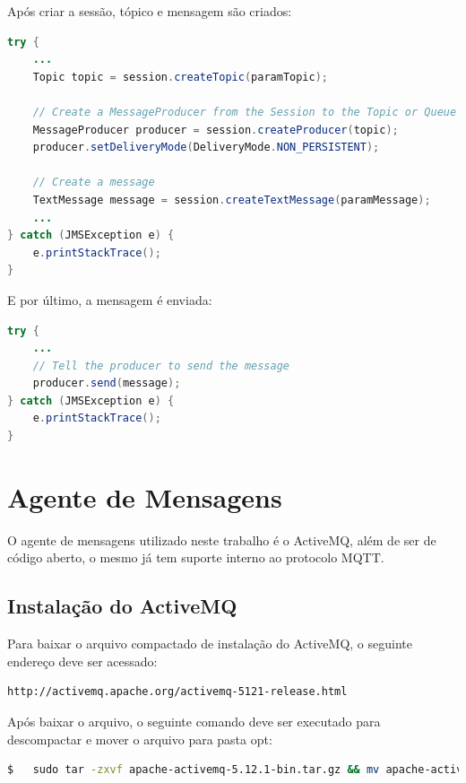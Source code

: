 Após criar a sessão, tópico e mensagem são criados: \\ 

\begin{lstlisting}[language=java]
try {
	...
	Topic topic = session.createTopic(paramTopic);

	// Create a MessageProducer from the Session to the Topic or Queue
	MessageProducer producer = session.createProducer(topic);
	producer.setDeliveryMode(DeliveryMode.NON_PERSISTENT);

	// Create a message
	TextMessage message = session.createTextMessage(paramMessage);
	...
} catch (JMSException e) {
	e.printStackTrace();
}
\end{lstlisting}

E por último, a mensagem é enviada: \\

\begin{lstlisting}[language=java]
try {
	...
	// Tell the producer to send the message
	producer.send(message);
} catch (JMSException e) {
	e.printStackTrace();
}
\end{lstlisting}

\section{Agente de Mensagens}
\label{sec:agente-mensagens}

O agente de mensagens utilizado neste trabalho é o ActiveMQ, além de ser de código aberto, o mesmo já tem suporte interno ao protocolo MQTT.

\subsection{Instalação do ActiveMQ}
\label{sec:instalacao-activemq}

Para baixar o arquivo compactado de instalação do ActiveMQ, o seguinte endereço deve ser acessado: \\

\begin{lstlisting}
http://activemq.apache.org/activemq-5121-release.html
\end{lstlisting}

Após baixar o arquivo, o seguinte comando deve ser executado para descompactar e mover o arquivo para pasta opt: \\

\begin{lstlisting}[language=bash]
$   sudo tar -zxvf apache-activemq-5.12.1-bin.tar.gz && mv apache-activemq-5.12.1 /opt/
\end{lstlisting}

